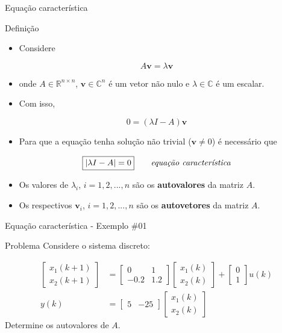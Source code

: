\begin{frame}{Equação característica}
\begin{block}{Definição}
	\begin{itemize}
		\item Considere
	\end{itemize}
$$A \bm{v} = \lambda \bm{v}$$
\vspace{-0.3cm}
	\begin{itemize}
		\item[] onde $A \in \mathbb{R}^{n \times n}$, $\bm{v} \in \mathbb{C}^{n}$ é um vetor não nulo e $\lambda \in \mathbb{C}$ é um escalar.
		\item Com isso,
	\end{itemize}
$$0 = (\lambda I - A) \bm{v}$$
\vspace{-0.3cm}
	\begin{itemize}
		\item Para que a equação tenha solução não trivial ($\bm{v} \neq 0$) é necessário que
	\end{itemize}
$$\boxed{|\lambda I - A| =  0} \qquad \text{\textit{equação característica}}$$
\vspace{-0.3cm}
    \begin{itemize}
		\item Os valores de $\lambda_i$, $i = 1, 2, ..., n$ são os \textbf{autovalores} da matriz $A$.
		\item Os respectivos $\bm{v}_i$, $i = 1, 2, ..., n$ são os \textbf{autovetores} da matriz $A$.
	\end{itemize}
\end{block}
\end{frame}

\begin{frame}{Equação característica - Exemplo \#01}
\begin{block}{Problema}
Considere o sistema discreto:

\begin{align*}
    \begin{bmatrix} x_1(k+1) \\ x_2(k+1) \end{bmatrix}
    &=
    \begin{bmatrix}
    0 & 1 \\ -\num{0,2} & \num{1,2}
    \end{bmatrix}
    \begin{bmatrix}
    x_1(k) \\ x_2(k)
    \end{bmatrix}
    +
    \begin{bmatrix}
    0 \\ 1
    \end{bmatrix}
    u(k) \\
    y(k)
    &=
    \begin{bmatrix}
    5 & -25
    \end{bmatrix}
    \begin{bmatrix}
    x_1(k) \\ x_2(k)
    \end{bmatrix}
\end{align*}
Determine os autovalores de $A$.
\end{block}
\end{frame}

